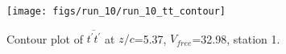 \begin{figure}[H]
\centering
\texttt{[image: figs/run\_10/run\_10\_tt\_contour]}
\caption{Contour plot of $\overline{t^\prime t^\prime}$ at $z/c$=5.37, $V_{free}$=32.98, station 1.}
\label{fig:run_10_tt_contour}
\end{figure}


